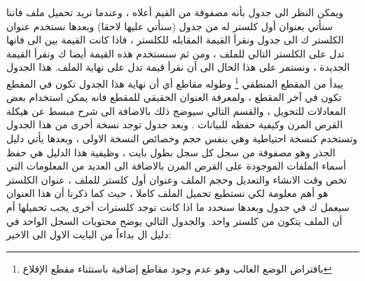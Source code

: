 \documentclass[document.tex]{subfiles}
\begin{document}
ويمكن النظر الى جدول  بأنه مصفوفة من القيم أعلاه ، وعندما نريد تحميل ملف فاننا سنأتي بعنوان أول كلستر له من جدول  (سنأتي عليها لاحقا) وبعدها نستخدم عنوان الكلستر ك  الى جدول  ونقرأ القيمة المقابله للكلستر ، فاذا كانت القيمة بين  الى  فانها تدل على الكلستر التالي للملف ، ومن ثم سنستخدم هذه القيمة أيضا ك  ونقرأ القيمة الجديدة ، ونستمر على هذا الحال الى أن نقرأ قيمة تدل على نهاية الملف.
هذا الجدول  يبدأ من المقطع المنطقي \footnote{بافتراض الوضع الغالب وهو عدم وجود مقاطع إضافية باستثناء مقطع الإقلاع} وطوله  مقاطع أي أن نهاية هذا الجدول تكون في المقطع تكون في آخر المقطع ، ولمعرفة العنوان الحقيقي للمقطع فانه يمكن استخدام بعض المعادلات للتحويل ، والقسم التالي سيوضح ذلك بالاضافة الى شرح مبسط عن هيكلة القرص المرن وكيفية حفظه للبيانات .
وبعد جدول  توجد نسخة أخرى من هذا الجدول وتستخدم كنسخة احتياطية  وهي بنفس حجم وخصائص النسخة الاولى ، وبعدها يأتي دليل الجذر  وهو مصفوفة من  سجل كل سجل بطول  بايت ، وظيفية هذا الدليل هي حفظ أسماء الملفات الموجودة على القرص المرن بالاضافة الى العديد من المعلومات التي تخص وقت الانشاء والتعديل وحجم الملف وعنوان أول كلستر للملف ، عنوان الكلستر هو أهم معلومة لكي نستطيع تحميل الملف كاملا ، حيث كما ذكرنا أن هذا العنوان سيعمل ك  في جدول  وبعدها سنحدد ما اذا كانت توجد كلسترات أخرى يجب تحميلها أم أن الملف يتكون من كلستر واحد. والجدول التالي يوضح محتويات السجل الواحد في دليل ال  بداءاً من البايت الاول الى الاخير:
\end{document}
